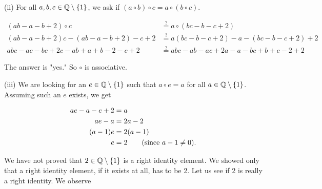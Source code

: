 \documentclass[11pt]{amsbook}
\begin{document}
    \hspace{15mm}(ii) For all $a,b,c\in \mathbb{Q}\setminus\{1\}$, we ask if $(a\circ b)\circ c=a\circ (b\circ c)$. 
    
    \vspace{-5mm}
    
    \begin{align*}
        (ab-a-b+2)\circ c &\stackrel{?}{=} a\circ (bc-b-c+2) \\
        (ab-a-b+2)c-(ab-a-b+2)-c+2 &\stackrel{?}{=} a(bc-b-c+2)-a-(bc-b-c+2)+2 \\
        abc-ac-bc+2c-ab+a+b-2-c+2 &\stackrel{?}{=} abc-ab-ac+2a-a-bc+b+c-2+2
    \end{align*}
    
    \begin{flushleft}
        The answer is "yes." So $\circ$ is associative.
    \end{flushleft}
    
    \hspace{15mm}(iii) We are looking for an $e\in\mathbb{Q}\setminus\{1\}$ such that $a\circ e=a$ for all $a\in\mathbb{Q}\setminus\{1\}$. Assuming such an $e$ exists, we get
    
    \vspace{-5mm}
    
    \begin{align*}
        ae-a-e+2&=a \\
        ae-a&=2a-2 \\
        (a-1)e&=2(a-1) \\
        e&=2 \text{\qquad (since $a-1\neq0$).}
    \end{align*}
    
    \begin{flushleft}
        We have not proved that $2\in\mathbb{Q}\setminus\{1\}$ is a right identity element. We showed only that a right identity element, if it exists at all, has to be 2. Let us see if 2 is really a right identity. We observe
    \end{flushleft}
    
\end{document}
